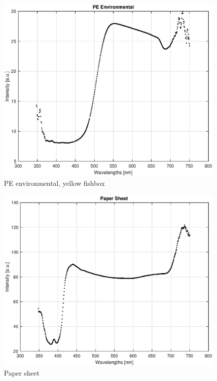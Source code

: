 \begin{appendices}
\begin{figure}
    \centering
    \includegraphics[width = 12cm]{Images/appendix/p-env_yellowbowl.eps}
    \caption[PE Environmental, Yellow]{PE environmental, yellow fishbox}
\end{figure}

\begin{figure}
    \centering
    \includegraphics[width = 12cm]{Images/appendix/papersheet.eps}
    \caption[Paper Sheet]{Paper sheet}
    \label{fig:paper}
\end{figure}


\end{appendices}
